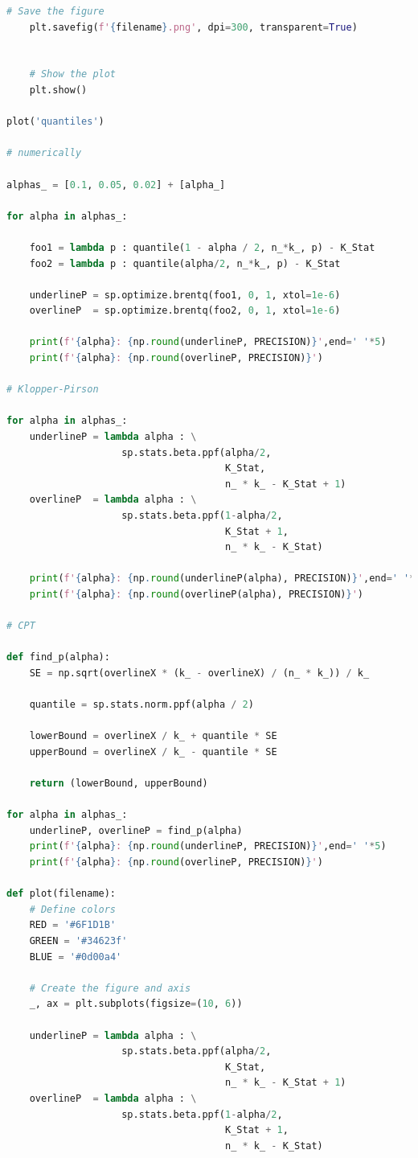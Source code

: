 \documentclass[a4paper, 14pt]{extarticle}
\begin{document}
\begin{center}
\begin{lstlisting}[language=Python]
    # Save the figure
    plt.savefig(f'{filename}.png', dpi=300, transparent=True)


    # Show the plot
    plt.show()

plot('quantiles')

# numerically

alphas_ = [0.1, 0.05, 0.02] + [alpha_] 

for alpha in alphas_:

    foo1 = lambda p : quantile(1 - alpha / 2, n_*k_, p) - K_Stat
    foo2 = lambda p : quantile(alpha/2, n_*k_, p) - K_Stat

    underlineP = sp.optimize.brentq(foo1, 0, 1, xtol=1e-6)
    overlineP  = sp.optimize.brentq(foo2, 0, 1, xtol=1e-6)

    print(f'{alpha}: {np.round(underlineP, PRECISION)}',end=' '*5)
    print(f'{alpha}: {np.round(overlineP, PRECISION)}')

# Klopper-Pirson

for alpha in alphas_:
    underlineP = lambda alpha : \
                    sp.stats.beta.ppf(alpha/2, 
                                      K_Stat, 
                                      n_ * k_ - K_Stat + 1)
    overlineP  = lambda alpha : \
                    sp.stats.beta.ppf(1-alpha/2, 
                                      K_Stat + 1, 
                                      n_ * k_ - K_Stat)

    print(f'{alpha}: {np.round(underlineP(alpha), PRECISION)}',end=' '*5)
    print(f'{alpha}: {np.round(overlineP(alpha), PRECISION)}')

# CPT

def find_p(alpha):
    SE = np.sqrt(overlineX * (k_ - overlineX) / (n_ * k_)) / k_

    quantile = sp.stats.norm.ppf(alpha / 2)

    lowerBound = overlineX / k_ + quantile * SE
    upperBound = overlineX / k_ - quantile * SE

    return (lowerBound, upperBound)

for alpha in alphas_:
    underlineP, overlineP = find_p(alpha)
    print(f'{alpha}: {np.round(underlineP, PRECISION)}',end=' '*5)
    print(f'{alpha}: {np.round(overlineP, PRECISION)}')

def plot(filename):
    # Define colors
    RED = '#6F1D1B'
    GREEN = '#34623f'
    BLUE = '#0d00a4'

    # Create the figure and axis
    _, ax = plt.subplots(figsize=(10, 6))

    underlineP = lambda alpha : \
                    sp.stats.beta.ppf(alpha/2,   
                                      K_Stat,     
                                      n_ * k_ - K_Stat + 1)
    overlineP  = lambda alpha : \
                    sp.stats.beta.ppf(1-alpha/2, 
                                      K_Stat + 1, 
                                      n_ * k_ - K_Stat)


\end{lstlisting}
\end{center}
\end{document}
